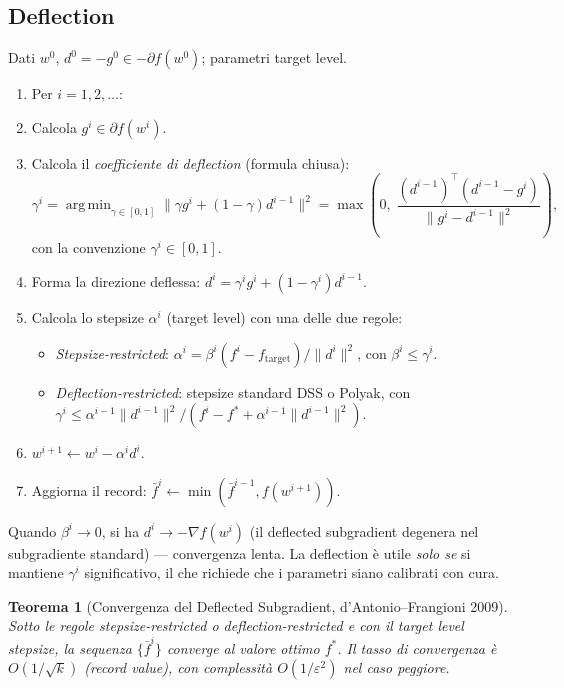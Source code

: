 \documentclass[11pt, a4paper, twoside]{book}
\theoremstyle{definition}
\theoremstyle{plain}
\newtheorem{thm}{Teorema}[chapter]
\theoremstyle{remark}
\DeclareMathOperator*{\argmin}{arg\,min}
\begin{document}
\subsection{Deflection}

\begin{algobox}
Dati $w^0$, $d^0 = -g^0 \in -\partial f(w^0)$; parametri target level.
\begin{enumerate}
  \item Per $i = 1, 2, \ldots$:
  \item \quad Calcola $g^i \in \partial f(w^i)$.
  \item \quad Calcola il \emph{coefficiente di deflection} (formula chiusa):
        \[
          \gamma^i = \argmin_{\gamma \in [0,1]} \|\gamma g^i + (1{-}\gamma) d^{i-1}\|^2
          = \max\!\left(0,\; \frac{(d^{i-1})^\top(d^{i-1} - g^i)}{\|g^i - d^{i-1}\|^2}\right),
        \]
        con la convenzione $\gamma^i \in [0,1]$.
  \item \quad Forma la direzione deflessa:
        $d^i = \gamma^i g^i + (1{-}\gamma^i) d^{i-1}$.
  \item \quad Calcola lo stepsize $\alpha^i$ (target level) con una delle due regole:
        \begin{itemize}
          \item \emph{Stepsize-restricted}: $\alpha^i = \beta^i(f^i - f_{\mathrm{target}}) / \|d^i\|^2$,
                con $\beta^i \leq \gamma^i$.
          \item \emph{Deflection-restricted}: stepsize standard DSS o Polyak, con
                $\gamma^i \leq \alpha^{i-1}\|d^{i-1}\|^2 / (f^i - f^* + \alpha^{i-1}\|d^{i-1}\|^2)$.
        \end{itemize}
  \item \quad $w^{i+1} \leftarrow w^i - \alpha^i d^i$.
  \item \quad Aggiorna il record: $\bar{f}^i \leftarrow \min(\bar{f}^{i-1}, f(w^{i+1}))$.
\end{enumerate}
\end{algobox}

\begin{warningbox}
Quando $\beta^i \to 0$, si ha $d^i \to -\nabla f(w^i)$ (il deflected subgradient degenera
nel subgradiente standard) — convergenza lenta. La deflection è utile \emph{solo se} si mantiene
$\gamma^i$ significativo, il che richiede che i parametri siano calibrati con cura.
\end{warningbox}

\begin{thm}[Convergenza del Deflected Subgradient, d'Antonio--Frangioni 2009]
Sotto le regole stepsize-restricted o deflection-restricted e con il target level stepsize,
la sequenza $\{\bar{f}^i\}$ converge al valore ottimo $f^*$. Il tasso di convergenza è
$O(1/\sqrt{k})$ (record value), con complessità $O(1/\varepsilon^2)$ nel caso peggiore.
\end{thm}
\end{document}
